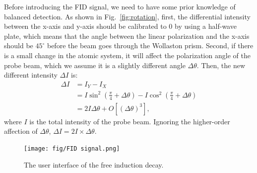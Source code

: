 \documentclass{article}
\begin{document}
Before introducing the FID signal, we need to have some prior knowledge of balanced detection. As shown in Fig.~\ref{fig:rotation}, first, the differential intensity between the x-axis and y-axis should be calibrated to 0 by using a half-wave plate, which means that the angle between the linear polarization and the x-axis should be $45^{\circ}$ before the beam goes through the Wollaston prism. Second, if there is a small change in the atomic system, it will affect the polarization angle of the probe beam, which we assume it is a slightly different angle $\Delta\theta$. Then, the new different intensity $\Delta I$ is:
\begin{equation}
    \begin{aligned}
        \Delta I &= I_{Y}-I_{X}\\
        &=I\sin^2(\frac{\pi}{4}+\Delta\theta)-I\cos^2(\frac{\pi}{4}+\Delta \theta)\\
        &=2I\Delta\theta+O[(\Delta\theta)^3],
        \label{eq:Rotation Relationship}
    \end{aligned}
\end{equation}
where $I$ is the total intensity of the probe beam. Ignoring the higher-order affection of $\Delta\theta$, $\Delta I = 2I\times\Delta \theta$.

\begin{figure}[htbp]
    \centering
    \texttt{[image: fig/FID signal.png]}
    \caption{The user interface of the free induction decay.}
    \label{fig:single FID}
\end{figure}
\end{document}
